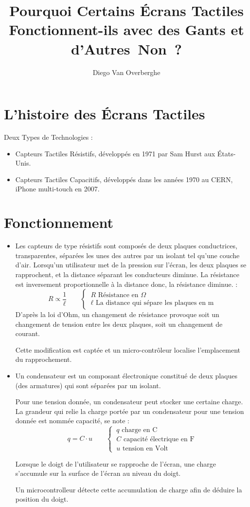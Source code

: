 \documentclass[DIV=12]{scrartcl}
\title{Pourquoi Certains Écrans Tactiles Fonctionnent-ils avec des Gants et d'Autres~Non~?}
\author{Diego Van Overberghe}
\begin{document}
    \maketitle
   \section{L'histoire des Écrans Tactiles}
   Deux Types de Technologies :
   \begin{itemize} 
       \item Capteurs Tactiles Résistifs, développés en 1971  par Sam Hurst aux États-Unis.
       \item Capteurs Tactiles Capacitifs, développés dans les années 1970 au CERN, iPhone multi-touch en 2007.
   \end{itemize}
   \section{Fonctionnement}
   \begin{itemize}
        \item Les capteurs de type résistifs sont composés de deux plaques conductrices, transparentes, séparées les unes des autres par un isolant tel qu'une couche d'air.
        Lorsqu'un utilisateur met de la pression sur l'écran, les deux plaques se rapprochent, et la distance séparant les conducteurs diminue. La résistance est inversement proportionnelle à la distance donc, la résistance diminue. : \[R\propto\frac{1}{\ell}\qquad\begin{cases}~R\text{ Résistance en }\Omega\\~\ell\text{ La distance qui sépare les plaques en m}\end{cases}\]
        D'après la loi d'Ohm, un changement de résistance provoque soit un changement de tension entre les deux plaques, soit un changement de courant.
       
        Cette modification est captée et un micro-contrôleur localise l'emplacement du rapprochement.
        \item Un condensateur est un composant électronique constitué de deux plaques (des armatures) qui sont séparées par un isolant.
        
        Pour une tension donnée, un condensateur peut stocker une certaine charge. La grandeur qui relie la charge portée par un condensateur pour une tension donnée est nommée capacité, se note : \[q=C\cdot u\qquad\begin{cases}~q\text{ charge en C}\\~C\text{ capacité électrique en F}\\~u\text{ tension en Volt}\end{cases}\]
        
        Lorsque le doigt de l'utilisateur se rapproche de l'écran, une charge s'accumule sur la surface de l'écran au niveau du doigt.
        
        Un microcontrolleur détecte cette accumulation de charge afin de déduire la position du doigt.
   \end{itemize}
\end{document}
